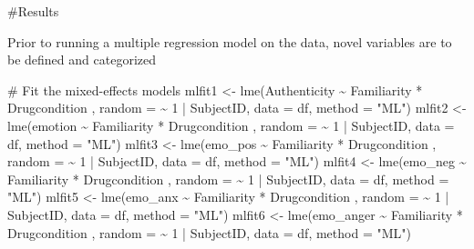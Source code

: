 \documentclass[
  man,
  longtable,
  nolmodern,
  notxfonts,
  notimes,
  colorlinks=true,linkcolor=blue,citecolor=blue,urlcolor=blue]{apa7}
\newenvironment{Shaded}{\begin{snugshade}}{\end{snugshade}}
\newcommand{\AttributeTok}[1]{\textcolor[rgb]{0.40,0.45,0.13}{#1}}
\newcommand{\CommentTok}[1]{\textcolor[rgb]{0.37,0.37,0.37}{#1}}
\newcommand{\DecValTok}[1]{\textcolor[rgb]{0.68,0.00,0.00}{#1}}
\newcommand{\FunctionTok}[1]{\textcolor[rgb]{0.28,0.35,0.67}{#1}}
\newcommand{\NormalTok}[1]{\textcolor[rgb]{0.00,0.23,0.31}{#1}}
\newcommand{\OtherTok}[1]{\textcolor[rgb]{0.00,0.23,0.31}{#1}}
\newcommand{\SpecialCharTok}[1]{\textcolor[rgb]{0.37,0.37,0.37}{#1}}
\newcommand{\StringTok}[1]{\textcolor[rgb]{0.13,0.47,0.30}{#1}}
\begin{document}
\#Results

Prior to running a multiple regression model on the data, novel
variables are to be defined and categorized

\begin{Shaded}
\begin{Highlighting}[]
\CommentTok{\# Fit the mixed{-}effects models}
\NormalTok{mlfit1 }\OtherTok{\textless{}{-}} \FunctionTok{lme}\NormalTok{(Authenticity }\SpecialCharTok{\textasciitilde{}}\NormalTok{ Familiarity }\SpecialCharTok{*}\NormalTok{ Drugcondition , }\AttributeTok{random =}  \SpecialCharTok{\textasciitilde{}} \DecValTok{1} \SpecialCharTok{|}\NormalTok{ SubjectID, }\AttributeTok{data =}\NormalTok{ df, }\AttributeTok{method =} \StringTok{"ML"}\NormalTok{)}
\NormalTok{mlfit2 }\OtherTok{\textless{}{-}} \FunctionTok{lme}\NormalTok{(emotion }\SpecialCharTok{\textasciitilde{}}\NormalTok{ Familiarity }\SpecialCharTok{*}\NormalTok{ Drugcondition , }\AttributeTok{random =}  \SpecialCharTok{\textasciitilde{}} \DecValTok{1} \SpecialCharTok{|}\NormalTok{ SubjectID, }\AttributeTok{data =}\NormalTok{ df, }\AttributeTok{method =} \StringTok{"ML"}\NormalTok{)}
\NormalTok{mlfit3 }\OtherTok{\textless{}{-}} \FunctionTok{lme}\NormalTok{(emo\_pos }\SpecialCharTok{\textasciitilde{}}\NormalTok{ Familiarity }\SpecialCharTok{*}\NormalTok{ Drugcondition , }\AttributeTok{random =}  \SpecialCharTok{\textasciitilde{}} \DecValTok{1} \SpecialCharTok{|}\NormalTok{ SubjectID, }\AttributeTok{data =}\NormalTok{ df, }\AttributeTok{method =} \StringTok{"ML"}\NormalTok{)}
\NormalTok{mlfit4 }\OtherTok{\textless{}{-}} \FunctionTok{lme}\NormalTok{(emo\_neg }\SpecialCharTok{\textasciitilde{}}\NormalTok{ Familiarity }\SpecialCharTok{*}\NormalTok{ Drugcondition , }\AttributeTok{random =}  \SpecialCharTok{\textasciitilde{}} \DecValTok{1} \SpecialCharTok{|}\NormalTok{ SubjectID, }\AttributeTok{data =}\NormalTok{ df, }\AttributeTok{method =} \StringTok{"ML"}\NormalTok{)}
\NormalTok{mlfit5 }\OtherTok{\textless{}{-}} \FunctionTok{lme}\NormalTok{(emo\_anx }\SpecialCharTok{\textasciitilde{}}\NormalTok{ Familiarity }\SpecialCharTok{*}\NormalTok{ Drugcondition , }\AttributeTok{random =}  \SpecialCharTok{\textasciitilde{}} \DecValTok{1} \SpecialCharTok{|}\NormalTok{ SubjectID, }\AttributeTok{data =}\NormalTok{ df, }\AttributeTok{method =} \StringTok{"ML"}\NormalTok{)}
\NormalTok{mlfit6 }\OtherTok{\textless{}{-}} \FunctionTok{lme}\NormalTok{(emo\_anger }\SpecialCharTok{\textasciitilde{}}\NormalTok{ Familiarity }\SpecialCharTok{*}\NormalTok{ Drugcondition , }\AttributeTok{random =}  \SpecialCharTok{\textasciitilde{}} \DecValTok{1} \SpecialCharTok{|}\NormalTok{ SubjectID, }\AttributeTok{data =}\NormalTok{ df, }\AttributeTok{method =} \StringTok{"ML"}\NormalTok{)}

\end{Highlighting}
\end{Shaded}
\end{document}
